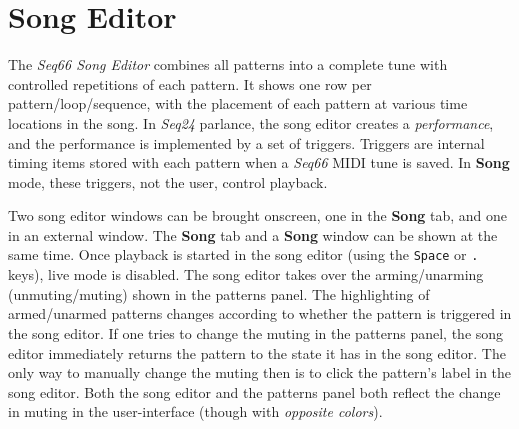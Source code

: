 %
%
%

\section{Song Editor}
\label{sec:song_editor}

   The \textsl{Seq66 Song Editor} combines all patterns
   into a complete tune with controlled repetitions of each pattern.
   It shows one row per pattern/loop/sequence,
   with the placement of each pattern at various time locations in the song.
   In \textsl{Seq24} parlance, the song editor creates a
   \textsl{performance}, and the performance is implemented by a set of
   triggers.
   Triggers are internal timing items stored with each pattern when a
   \textsl{Seq66} MIDI tune is saved.
   In \textbf{Song} mode, these triggers, not the user, control
   playback.

   Two song editor windows can be
   brought onscreen, one in the \textbf{Song} tab, and
   one in an external window.
   The \textbf{Song} tab and a \textbf{Song} window can be shown at the
   same time.
   Once playback is started in the song editor (using the \texttt{Space} or
   \texttt{.} keys), live mode is disabled.
   The song editor takes over the arming/unarming (unmuting/muting)
   shown in the patterns panel.  The highlighting of armed/unarmed patterns
   changes according to whether the pattern is triggered in the song editor.
   If one tries to change the muting in
   the patterns panel, the song editor immediately returns the pattern to the
   state it has in the song editor.  The only way to manually change the muting
   then is to click the pattern's label in the song editor.
   Both the song editor and the patterns panel both reflect the change in
   muting in the user-interface (though with \textsl{opposite colors}).

